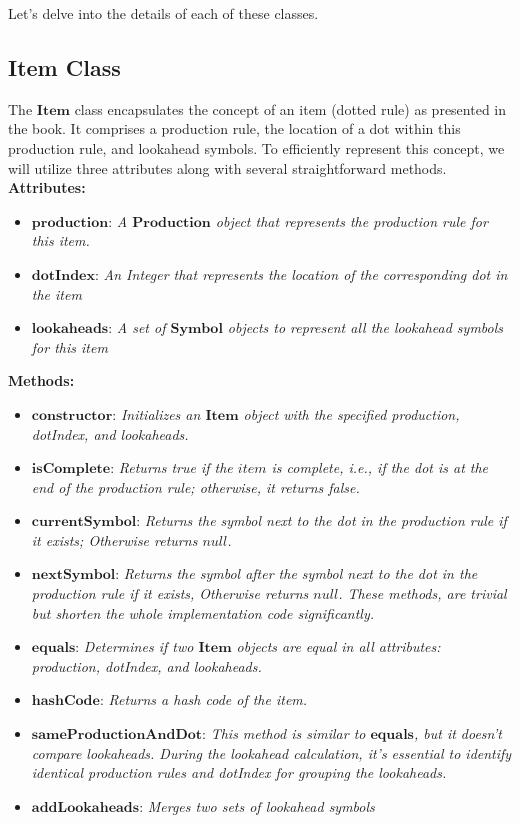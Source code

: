 Let’s delve into the details of each of these classes.

\subsection{Item Class}

The \(\boldsymbol{Item}\) class encapsulates the concept of an item (dotted rule) as presented in the book. It comprises a production rule, the location of a dot within this production rule, and lookahead symbols. To efficiently represent this concept, we will utilize three attributes along with several straightforward methods.\\

\textbf{Attributes:}
\begin{itemize}
    \item \(\boldsymbol{production}\): \textit{A \(\boldsymbol{Production}\) object that represents the production rule for this item.}
    \item \(\boldsymbol{dotIndex}\): \textit{An Integer that represents the location of the corresponding dot in the item}
    \item \(\boldsymbol{lookaheads}\): \textit{A set of \(\boldsymbol{Symbol}\) objects to represent all the lookahead symbols for this item}
\end{itemize}

\textbf{Methods:}
\begin{itemize}
    \item \(\boldsymbol{constructor}\): \textit{Initializes an \(\boldsymbol{Item}\) object with the specified production, dotIndex, and lookaheads.}
    \item \(\boldsymbol{isComplete}\): \textit{Returns true if the \(item\) is complete, i.e., if the dot is at the end of the production rule; otherwise, it returns false.}
    \item \(\boldsymbol{currentSymbol}\): \textit{Returns the symbol next to the dot in the production rule if it exists; Otherwise returns \(null\).}
    \item \(\boldsymbol{nextSymbol}\): \textit{Returns the symbol after the symbol next to the dot in the production rule if it exists, Otherwise returns \(null\). These methods, are trivial but shorten the whole implementation code significantly.}
    \item \(\boldsymbol{equals}\): \textit{Determines if two \(\boldsymbol{Item}\) objects are equal in all attributes: production, dotIndex, and lookaheads.}
    \item \(\boldsymbol{hashCode}\): \textit{Returns a hash code of the item.}
    \item \(\boldsymbol{sameProductionAndDot}\): \textit{This method is similar to \(\boldsymbol{equals}\), but it doesn't compare lookaheads. During the lookahead calculation, it's essential to identify identical production rules and dotIndex for grouping the lookaheads.}
    \item \(\boldsymbol{addLookaheads}\): \textit{Merges two sets of lookahead symbols}
\end{itemize}

